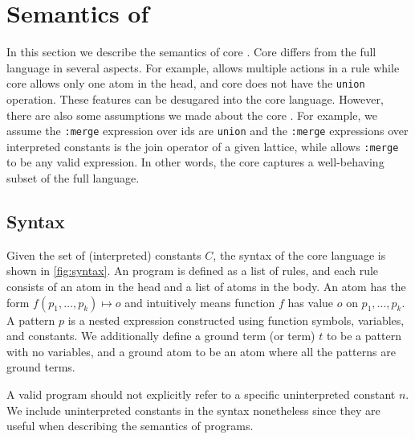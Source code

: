 \section{Semantics of \egglog}

In this section we describe the semantics of core \egglog.
Core \egglog differs from the full \egglog language in several aspects.
For example,
 \egglog allows multiple actions in a rule 
 while core \egglog allows only one atom in the head,
 and core \egglog does not have the \lstinline{union} operation.
These \egglog features can be desugared into the core language.
However, there are also some assumptions we made about the core \egglog.
For example, we assume the \lstinline{:merge} expression over ids
 are \lstinline{union} and the \lstinline{:merge} expressions 
 over interpreted constants is the join operator of a given lattice,
 while \egglog allows \lstinline{:merge} to be any valid \egglog expression.
In other words,
 the core \egglog captures a well-behaving subset of the full \egglog language.

\subsection{Syntax}

Given the set of (interpreted) constants $C$,
 the syntax of the core \egglog language is shown in \autoref{fig:syntax}.
An \egglog program is defined as a list of rules, 
 and each rule consists of an atom in the head
 and a list of atoms in the body.
An atom has the form $f(p_1,\ldots,p_k)\mapsto o$ 
 and intuitively means function $f$ has value $o$ on $p_1,\ldots, p_k$.
A pattern $p$ is a nested expression 
 constructed using function symbols, variables, and constants.
We additionally define a ground term (or term) $t$ to be a pattern with no variables,
 and a ground atom to be an atom where all the patterns are ground terms.

A valid \egglog program should not explicitly refer to 
 a specific uninterpreted constant $n$.
We include uninterpreted constants in the syntax nonetheless
 since they are useful when describing the semantics of \egglog programs.



